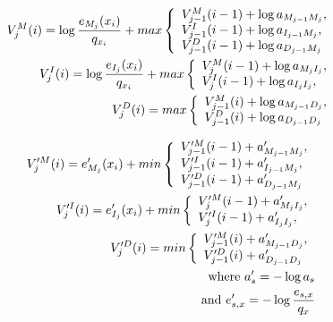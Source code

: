 \documentclass[preprint,nonatbib,blockstyle,nocopyrightspace,times]{sigplanconf}
\begin{document}
\begin{eqnarray}    
V_{j}^{M}(i) = \log\frac{e_{M_{j}}(x_{i})}{q_{x_{i}}} + max \left\{
\begin{array}{l l}
V_{j-1}^{M}(i - 1) + \log a_{M_{j-1}M_{j}},\\
V_{j-1}^{I}(i - 1) + \log a_{I_{j-1}M_{j}},\\
V_{j-1}^{D}(i - 1) + \log a_{D_{j-1}M_{j}}\\
\end{array} \right.\nonumber\\
V_{j}^{I}(i) = \log\frac{e_{I_{j}}(x_{i})}{q_{x_{i}}} + max \left\{
\begin{array}{l l}
V_{j}^{M}(i - 1) + \log a_{M_{j}I_{j}},\\
V_{j}^{I}(i - 1) + \log a_{I_{j}I_{j}},\\
\end{array} \right.\nonumber\\
V_{j}^{D}(i) = max \left\{
\begin{array}{l l}
V_{j-1}^{M}(i) + \log a_{M_{j-1}D_{j}},\\
V_{j-1}^{D}(i) + \log a_{D_{j-1}D_{j}}\\
\end{array} \right.\nonumber\\
\end{eqnarray}\label{viterbi_eqn}

\begin{eqnarray}    
V_{j}^{\prime M}(i) = e^{\prime}_{M_{j}}(x_{i}) + min \left\{
\begin{array}{l l}
V_{j-1}^{\prime M}(i - 1) + a^{\prime}_{M_{j-1}M_{j}},\\
V_{j-1}^{\prime I}(i - 1) + a^{\prime}_{I_{j-1}M_{j}},\\
V_{j-1}^{\prime D}(i - 1) + a^{\prime}_{D_{j-1}M_{j}}\\
\end{array} \right.\nonumber\\
V_{j}^{\prime I}(i) = e^{\prime}_{I_{j}}(x_{i}) + min \left\{
\begin{array}{l l}
V_{j}^{\prime M}(i - 1) + a^{\prime}_{M_{j}I_{j}},\\
V_{j}^{\prime I}(i - 1) + a^{\prime}_{I_{j}I_{j}},\\
\end{array} \right.\nonumber\\
V_{j}^{\prime D}(i) = min \left\{
\begin{array}{l l}
V_{j-1}^{\prime M}(i) + a^{\prime}_{M_{j-1}D_{j}},\\
V_{j-1}^{\prime D}(i) + a^{\prime}_{D_{j-1}D_{j}}\\
\end{array} \right.\nonumber\\
\text{where } a^{\prime}_{s} = - \log a_{s} \nonumber \\
\text{and } e^{\prime}_{s,x} = - \log\frac{e_{s,x}}{q_{x}} \nonumber
\end{eqnarray}\label{viterbi_log_eqn}
\end{document}
